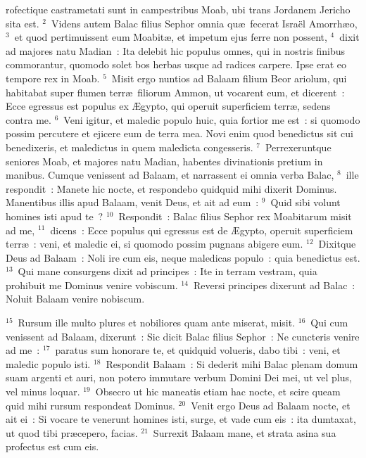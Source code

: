\bchapter
{}rofectique castrametati sunt in campestribus Moab, ubi trans Jordanem Jericho sita est.
${}^{2}$~Videns autem Balac filius Sephor omnia qu\ae\ fecerat Isra\"el Amorrh\ae o,
${}^{3}$~et quod pertimuissent eum Moabit\ae , et impetum ejus ferre non possent,
${}^{4}$~dixit ad majores natu Madian~: Ita delebit hic populus omnes, qui in nostris finibus commorantur, quomodo solet bos herbas usque ad radices carpere. Ipse erat eo tempore rex in Moab.
${}^{5}$~Misit ergo nuntios ad Balaam filium Beor ariolum, qui habitabat super flumen terr\ae\ filiorum Ammon, ut vocarent eum, et dicerent~: Ecce egressus est populus ex \AE gypto, qui operuit superficiem terr\ae , sedens contra me.
${}^{6}$~Veni igitur, et maledic populo huic, quia fortior me est~: si quomodo possim percutere et ejicere eum de terra mea. Novi enim quod benedictus sit cui benedixeris, et maledictus in quem maledicta congesseris.
${}^{7}$~Perrexeruntque seniores Moab, et majores natu Madian, habentes divinationis pretium in manibus. Cumque venissent ad Balaam, et narrassent ei omnia verba Balac,
${}^{8}$~ille respondit~: Manete hic nocte, et respondebo quidquid mihi dixerit Dominus. Manentibus illis apud Balaam, venit Deus, et ait ad eum~:
${}^{9}$~Quid sibi volunt homines isti apud te~?
${}^{10}$~Respondit~: Balac filius Sephor rex Moabitarum misit ad me,
${}^{11}$~dicens~: Ecce populus qui egressus est de \AE gypto, operuit superficiem terr\ae~: veni, et maledic ei, si quomodo possim pugnans abigere eum.
${}^{12}$~Dixitque Deus ad Balaam~: Noli ire cum eis, neque maledicas populo~: quia benedictus est.
${}^{13}$~Qui mane consurgens dixit ad principes~: Ite in terram vestram, quia prohibuit me Dominus venire vobiscum.
${}^{14}$~Reversi principes dixerunt ad Balac~: Noluit Balaam venire nobiscum.


${}^{15}$~Rursum ille multo plures et nobiliores quam ante miserat, misit.
${}^{16}$~Qui cum venissent ad Balaam, dixerunt~: Sic dicit Balac filius Sephor~: Ne cuncteris venire ad me~:
${}^{17}$~paratus sum honorare te, et quidquid volueris, dabo tibi~: veni, et maledic populo isti.
${}^{18}$~Respondit Balaam~: Si dederit mihi Balac plenam domum suam argenti et auri, non potero immutare verbum Domini Dei mei, ut vel plus, vel minus loquar.
${}^{19}$~Obsecro ut hic maneatis etiam hac nocte, et scire queam quid mihi rursum respondeat Dominus.
${}^{20}$~Venit ergo Deus ad Balaam nocte, et ait ei~: Si vocare te venerunt homines isti, surge, et vade cum eis~: ita dumtaxat, ut quod tibi pr\ae cepero, facias.
${}^{21}$~Surrexit Balaam mane, et strata asina sua profectus est cum eis.


